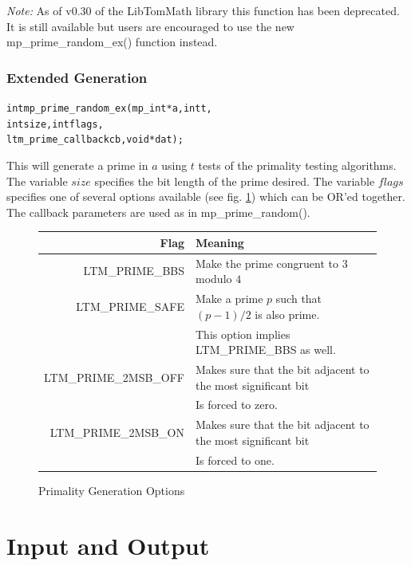 \documentclass[synpaper]{book}
\begin{document}
\textit{Note:}  As of v0.30 of the LibTomMath library this function has been deprecated.  It is still available
but users are encouraged to use the new mp\_prime\_random\_ex() function instead.

\subsection{Extended Generation}
\begin{alltt}
int mp_prime_random_ex(mp_int *a,    int t, 
                       int     size, int flags, 
                       ltm_prime_callback cb, void *dat);
\end{alltt}
This will generate a prime in $a$ using $t$ tests of the primality testing algorithms.  The variable $size$
specifies the bit length of the prime desired.  The variable $flags$ specifies one of several options available
(see fig. \ref{fig:primeopts}) which can be OR'ed together.  The callback parameters are used as in 
mp\_prime\_random().

\begin{figure}[here]
\begin{center}
\begin{small}
\begin{tabular}{|r|l|}
\hline \textbf{Flag}         & \textbf{Meaning} \\
\hline LTM\_PRIME\_BBS       & Make the prime congruent to $3$ modulo $4$ \\
\hline LTM\_PRIME\_SAFE      & Make a prime $p$ such that $(p - 1)/2$ is also prime. \\
                             & This option implies LTM\_PRIME\_BBS as well. \\
\hline LTM\_PRIME\_2MSB\_OFF & Makes sure that the bit adjacent to the most significant bit \\
                             & Is forced to zero.  \\
\hline LTM\_PRIME\_2MSB\_ON  & Makes sure that the bit adjacent to the most significant bit \\
                             & Is forced to one. \\
\hline
\end{tabular}
\end{small}
\end{center}
\caption{Primality Generation Options}
\label{fig:primeopts}
\end{figure}

\chapter{Input and Output}
\end{document}
